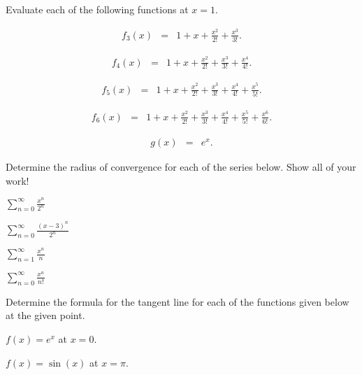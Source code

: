 \begin{problem}
\item Evaluate each of the following functions at $x=1$.
  \begin{subproblem}
  \item
    \begin{eqnarray*}
      f_3(x) & = & 1 + x + \frac{x^2}{2!} + \frac{x^3}{3!}.
    \end{eqnarray*}
    \vfill
  \item
    \begin{eqnarray*}
      f_4(x) & = & 1 + x + \frac{x^2}{2!} + \frac{x^3}{3!} + \frac{x^4}{4!}.
    \end{eqnarray*}
    \vfill
  \item
    \begin{eqnarray*}
      f_5(x) & = & 1 + x + \frac{x^2}{2!} + \frac{x^3}{3!} +
                   \frac{x^4}{4!} + \frac{x^5}{5!}.
    \end{eqnarray*}
    \vfill
  \item
    \begin{eqnarray*}
      f_6(x) & = & 1 + x + \frac{x^2}{2!} + \frac{x^3}{3!} +
                   \frac{x^4}{4!} + \frac{x^5}{5!} + \frac{x^6}{6!}.
    \end{eqnarray*}
    \vfill
  \item
    \begin{eqnarray*}
      g(x) & = & e^x.
    \end{eqnarray*}
    \vfill
  \end{subproblem}
\end{problem}


\begin{problem}
\item Determine the radius of convergence for each of the series
  below. Show all of your work!  
  \begin{subproblem}
    \item $\displaystyle \sum_{n=0}^\infty \frac{x^n}{2^n}$
      \vfill
    \item $\displaystyle \sum_{n=0}^\infty \frac{(x-3)^n}{2^n}$
      \vfill
      \clearpage
    \item $\displaystyle \sum_{n=1}^\infty \frac{x^n}{n} $
      \vfill
    \item $\displaystyle \sum_{n=0}^\infty \frac{x^n}{n!} $
      \vfill
  \end{subproblem}
  \clearpage
  \item Determine the formula for the tangent line for each of the functions given below at the given point.
  \begin{subproblem}
    \item $\displaystyle f(x)=e^x$ at $x=0$.
    \vfill
    \item $\displaystyle f(x)=\sin(x)$ at $x=\pi$.
    \vfill
  \end{subproblem}
\end{problem}


